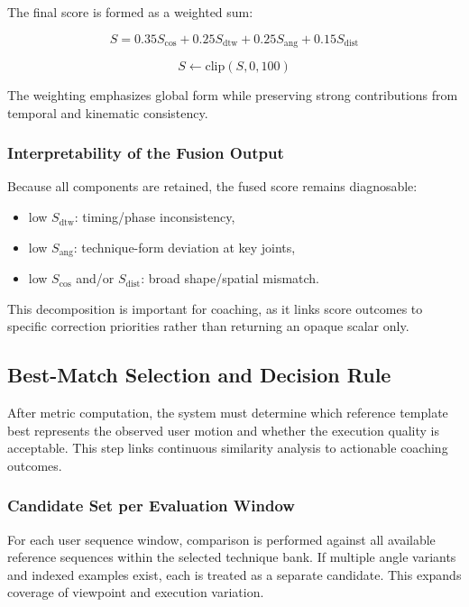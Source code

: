 \documentclass[12pt]{article}
\begin{document}
{The final score is formed as a weighted sum:

\[
S = 0.35S_{\text{cos}} + 0.25S_{\text{dtw}} + 0.25S_{\text{ang}} + 0.15S_{\text{dist}}
\]

\[
S \leftarrow \text{clip}(S,0,100)
\]

The weighting emphasizes global form while preserving strong contributions from temporal and kinematic consistency.

\subsubsection{Interpretability of the Fusion Output}

Because all components are retained, the fused score remains diagnosable:

\begin{itemize}
    \item low \(S_{\text{dtw}}\): timing/phase inconsistency,
    \item low \(S_{\text{ang}}\): technique-form deviation at key joints,
    \item low \(S_{\text{cos}}\) and/or \(S_{\text{dist}}\): broad shape/spatial mismatch.
\end{itemize}

This decomposition is important for coaching, as it links score outcomes to specific correction priorities rather than returning an opaque scalar only.

\subsection{Best-Match Selection and Decision Rule}

After metric computation, the system must determine which reference template best represents the observed user motion and whether the execution quality is acceptable. This step links continuous similarity analysis to actionable coaching outcomes.

\subsubsection{Candidate Set per Evaluation Window}

For each user sequence window, comparison is performed against all available reference sequences within the selected technique bank. If multiple angle variants and indexed examples exist, each is treated as a separate candidate. This expands coverage of viewpoint and execution variation.

}
\end{document}
